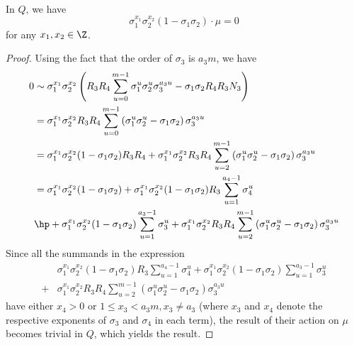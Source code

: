 \paragraph*{}
\begin{lemma}\label{diag}
In $Q$, we have $$\sigma_1^{x_1}\sigma_2^{x_2}(1-\sigma_1\sigma_2)\cdot \mu=0$$
for any $x_1,x_2\in\Z$.
\end{lemma}
\begin{proof}
Using the fact that the order of $\sigma_3$ is $a_3m$, we have
\begin{align*}
0&\sim \sigma_1^{x_1}\sigma_2^{x_2}\left(R_3R_4\sum_{u=0}^{m-1}\sigma_1^{u}\sigma_2^{u}\sigma_3^{a_3u}-\sigma_1\sigma_2R_4R_3N_3\right)\\
&=\sigma_1^{x_1}\sigma_2^{x_2}R_3R_4\sum_{u=0}^{m-1}\left(\sigma_1^{u}\sigma_2^{u}-\sigma_1\sigma_2\right)\sigma_3^{a_3u}\\
&=\sigma_1^{x_1}\sigma_2^{x_2}(1-\sigma_1\sigma_2)R_3R_4+\sigma_1^{x_1}\sigma_2^{x_2}R_3R_4\sum_{u=2}^{m-1}\left(\sigma_1^{u}\sigma_2^{u}-\sigma_1\sigma_2\right)\sigma_3^{a_3u}\\
&=\sigma_1^{x_1}\sigma_2^{x_2}(1-\sigma_1\sigma_2)+
\sigma_1^{x_1}\sigma_2^{x_2}(1-\sigma_1\sigma_2)R_3\sum_{u=1}^{a_4-1}\sigma_4^u
\\
&\hp+
\sigma_1^{x_1}\sigma_2^{x_2}(1-\sigma_1\sigma_2)\sum_{u=1}^{a_3-1}\sigma_3^u+\sigma_1^{x_1}\sigma_2^{x_2}R_3R_4\sum_{u=2}^{m-1}\left(\sigma_1^{u}\sigma_2^{u}-\sigma_1\sigma_2\right)\sigma_3^{a_3u}
\end{align*}
Since all the summands in the expression 
\begin{align*}
&\sigma_1^{x_1}\sigma_2^{x_2}(1-\sigma_1\sigma_2)R_3\sum_{u=1}^{a_4-1}\sigma_4^u
+\sigma_1^{x_1}\sigma_2^{x_2}(1-\sigma_1\sigma_2)\sum_{u=1}^{a_3-1}\sigma_3^u\\
+&\sigma_1^{x_1}\sigma_2^{x_2}R_3R_4\sum_{u=2}^{m-1}\left(\sigma_1^{u}\sigma_2^{u}-\sigma_1\sigma_2\right)\sigma_3^{a_3u}
\end{align*}
have either $x_4>0$ or $ 1\leq x_3<a_3m,  x_3\neq a_3$ (where $x_3$ and $x_4$ denote the respective exponents of $\sigma_3$ and $\sigma_4$ in each term), the result of their action on $\mu$ becomes trivial in $Q$, which yields the result.
\end{proof}

